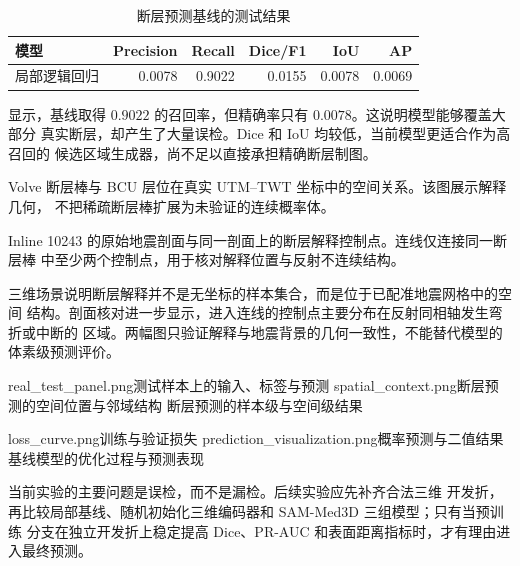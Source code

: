 \begin{table}[htbp]
  \centering
  \caption{断层预测基线的测试结果}
  \label{tab:fault-results}
  \begin{tabular}{lrrrrr}
    \toprule
    模型 & Precision & Recall & Dice/F1 & IoU & AP \\
    \midrule
    局部逻辑回归 & 0.0078 & 0.9022 & 0.0155 & 0.0078 & 0.0069 \\
    \bottomrule
  \end{tabular}
\end{table}

显示，基线取得 $0.9022$ 的召回率，但精确率只有
$0.0078$。这说明模型能够覆盖大部分
真实断层，却产生了大量误检。Dice 和 IoU 均较低，当前模型更适合作为高召回的
候选区域生成器，尚不足以直接承担精确断层制图。

  {Volve 断层棒与 BCU 层位在真实 UTM--TWT 坐标中的空间关系。该图展示解释几何，
  不把稀疏断层棒扩展为未验证的连续概率体。}

  {Inline 10243 的原始地震剖面与同一剖面上的断层解释控制点。连线仅连接同一断层棒
  中至少两个控制点，用于核对解释位置与反射不连续结构。}

三维场景说明断层解释并不是无坐标的样本集合，而是位于已配准地震网格中的空间
结构。剖面核对进一步显示，进入连线的控制点主要分布在反射同相轴发生弯折或中断的
区域。两幅图只验证解释与地震背景的几何一致性，不能替代模型的体素级预测评价。

  {real_test_panel.png}{测试样本上的输入、标签与预测}
  {spatial_context.png}{断层预测的空间位置与邻域结构}
  {断层预测的样本级与空间级结果}

  {loss_curve.png}{训练与验证损失}
  {prediction_visualization.png}{概率预测与二值结果}
  {基线模型的优化过程与预测表现}

当前实验的主要问题是误检，而不是漏检。后续实验应先补齐合法三维
开发折，再比较局部基线、随机初始化三维编码器和 SAM-Med3D 三组模型；只有当预训练
分支在独立开发折上稳定提高 Dice、PR-AUC 和表面距离指标时，才有理由进入最终预测。

\FloatBarrier

